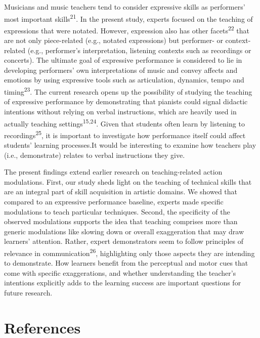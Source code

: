 \documentclass[
  man,floatsintext]{apa6}
\begin{document}
Musicians and music teachers tend to consider expressive skills as performers' most important skills\textsuperscript{21}. In the present study, experts focused on the teaching of expressions that were notated. However, expression also has other facets\textsuperscript{22} that are not only piece-related (e.g., notated expressions) but performer- or context-related (e.g., performer's interpretation, listening contexts such as recordings or concerts). The ultimate goal of expressive performance is considered to lie in developing performers' own interpretations of music and convey affects and emotions by using expressive tools such as articulation, dynamics, tempo and timing\textsuperscript{23}. The current research opens up the possibility of studying the teaching of expressive performance by demonstrating that pianists could signal didactic intentions without relying on verbal instructions, which are heavily used in actually teaching settings\textsuperscript{15,24}. Given that students often learn by listening to recordings\textsuperscript{25}, it is important to investigate how performance itself could affect students' learning processes.It would be interesting to examine how teachers play (i.e., demonstrate) relates to verbal instructions they give.

The present findings extend earlier research on teaching-related action modulations. First, our study sheds light on the teaching of technical skills that are an integral part of skill acquisition in artistic domains. We showed that compared to an expressive performance baseline, experts made specific modulations to teach particular techniques. Second, the specificity of the observed modulations supports the idea that teaching comprises more than generic modulations like slowing down or overall exaggeration that may draw learners' attention. Rather, expert demonstrators seem to follow principles of relevance in communication\textsuperscript{26}, highlighting only those aspects they are intending to demonstrate. How learners benefit from the perceptual and motor cues that come with specific exaggerations, and whether understanding the teacher's intentions explicitly adds to the learning success are important questions for future research.

\hypertarget{references}{%
\section{References}\label{references}}

\begingroup
\setlength{\parindent}{-0in}
\setlength{\leftskip}{0in}
\end{document}
